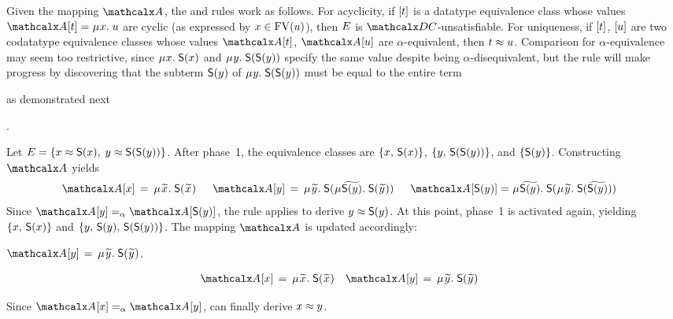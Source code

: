Given the mapping $\Val$, the  and  rules work as follows.
For acyclicity, if $[t]$ is a datatype equivalence class
whose values $\Val \ec{t} = \MU x.\; u$ are cyclic
(as expressed by $x \in \mathrm{FV}( u )$),
then $E$ is $\thD$-unsatisfiable.
For uniqueness, if $[t]$, $[u]$ are two codatatype equivalence classes
whose values $\Val \ec{t}$, $\Val \ec{u}$ are $\alpha$-equivalent,
then $t \approx u$. Comparison for $\alpha$-equivalence may seem too restrictive, since
$\MU x.\; \const{S}(x)$ and $\MU y.\; \const{S}(\const{S}(y))$ specify the same
value despite being $\alpha$-disequivalent, but the rule will
make progress by discovering that the subterm $\textsf{S}(y)$ of $\MU y.\;
\const{S}(\const{S}(y))$ must be equal to the entire term\begin{rep}
as demonstrated next\end{rep}.


\begin{examplex}
Let $E = \{ x \approx \textsf{S}(x),\; y \approx \textsf{S}(\textsf{S}(y)) \}$.
After phase~1, the equivalence classes %
are
$\{ x,\, \textsf{S}(x) \}$,
$\{ y,\, \textsf{S}(\textsf{S}(y)) \}$,
and $\{ \textsf{S}(y) \}$.
Constructing $\Val$ yields
\begin{align*}
\Val \ec{x} & \,=\, \MU {\Varec{x}}.\; \const{S}(\Varec{x}) &
\enskip %
\Val \ec{y} & \,=\,
\MU {\Varec{y}}.\; \const{S}(\smash{\MU {\VAREC{\const{S}(y)}}}.\; \const{S}( {\Varec{y}} ) )
\enskip %
 &
\Val \ec{\const{S}(y)} & =
\MU {\VAREC{\const{S}(y)}}.\; \const{S}(\MU {\Varec{y}}.\; \const{S}( {\VAREC{\const{S}(y)}} ) )
\end{align*}
Since $\Val \ec{y} \aequiv \Val \ec{\const{S}(y)}$,
the  rule applies to derive $y \approx \textsf{S}(y)$.
%
At this point, phase~1 is activated again, %
yielding
$\{ x,\, \textsf{S}(x) \}$ and
$\{ y,\, \textsf{S}(y),\allowbreak\, \textsf{S}(\textsf{S}(y)) \}$.
The mapping $\Val$ is updated accordingly:
\begin{conf}%
$\Val \ec{y} \,=\, \MU {\Varec{y}}.\; \const{S}({\Varec{y}})$.
\end{conf}%
\begin{rep}
\begin{align*}
\Val \ec{x} & \,=\, \MU {\Varec{x}}.\; \const{S}(\Varec{x})
&
\Val \ec{y} & \,=\, \MU {\Varec{y}}.\; \const{S}({\Varec{y}})
\end{align*}
\end{rep}
Since $\Val \ec{x} \aequiv \Val \ec{y}$,
 can finally derive $x \approx y$.
\xend
\end{examplex}

